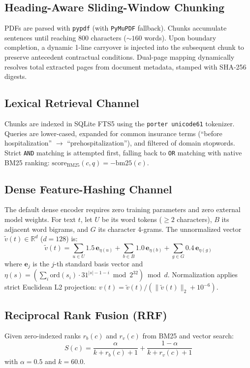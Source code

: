 \documentclass[conference]{IEEEtran}
\begin{document}
\subsection{Heading-Aware Sliding-Window Chunking}
PDFs are parsed with \texttt{pypdf} (with \texttt{PyMuPDF} fallback). Chunks accumulate sentences until reaching 800 characters ($\sim 160$ words). Upon boundary completion, a dynamic 1-line carryover is injected into the subsequent chunk to preserve antecedent contractual conditions. Dual-page mapping dynamically resolves total extracted pages from document metadata, stamped with SHA-256 digests.

\subsection{Lexical Retrieval Channel}
Chunks are indexed in SQLite FTS5 using the \texttt{porter unicode61} tokenizer. Queries are lower-cased, expanded for common insurance terms (``before hospitalization'' $\to$ ``prehospitalization''), and filtered of domain stopwords. Strict \texttt{AND} matching is attempted first, falling back to \texttt{OR} matching with native BM25 ranking:
$\text{score}_{\text{BM25}}(c, q) = -\text{bm25}(c)$.

\subsection{Dense Feature-Hashing Channel}
The default dense encoder requires zero training parameters and zero external model weights. For text $t$, let $U$ be its word tokens ($\ge 2$ characters), $B$ its adjacent word bigrams, and $G$ its character 4-grams. The unnormalized vector $\tilde{v}(t) \in \mathbb{R}^d$ ($d = 128$) is:
\begin{equation}
\tilde{v}(t) = \sum_{u \in U} 1.5 \, \mathbf{e}_{\eta(u)} + \sum_{b \in B} 1.0 \, \mathbf{e}_{\eta(b)} + \sum_{g \in G} 0.4 \, \mathbf{e}_{\eta(g)}
\end{equation}
where $\mathbf{e}_j$ is the $j$-th standard basis vector and $\eta(s) = \left( \sum_{i} \text{ord}(s_i) \cdot 31^{|s|-1-i} \bmod 2^{32} \right) \bmod d$. Normalization applies strict Euclidean L2 projection: $v(t) = \tilde{v}(t) / (\|\tilde{v}(t)\|_2 + 10^{-6})$.

\subsection{Reciprocal Rank Fusion (RRF)}
Given zero-indexed ranks $r_b(c)$ and $r_v(c)$ from BM25 and vector search:
\begin{equation}
S(c) = \frac{\alpha}{k + r_b(c) + 1} + \frac{1 - \alpha}{k + r_v(c) + 1}
\end{equation}
with $\alpha = 0.5$ and $k = 60.0$.
\end{document}
